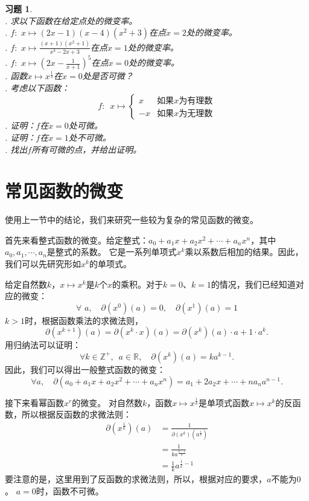 \documentclass[12pt,UTF8]{ctexbook}
\newtheorem{xt}{习题}[section]
\begin{document}
\begin{xt}
    \mbox{} \\
    . 求以下函数在给定点处的微变率。\\
    . $f: \,\, x \mapsto (2x - 1)(x -4)(x^2 + 3)$在点$x = 2$处的微变率。\\
    . $f: \,\, x \mapsto \frac{(x + 1)(x^2 + 1)}{x^3 - 2x + 3}$在点$x = 1$处的微变率。\\
    . $f: \,\, x \mapsto (2x - \frac{1}{x + 1})^5$在点$x = 0$处的微变率。\\
    . 函数$x \mapsto x^{\frac{1}{3}}$在$x = 0$处是否可微？\\
    . 考虑以下函数：
    $$ f: \,\,\, x\mapsto \left\{
        \begin{array}{cl}
            x & \mbox{如果}x\mbox{为有理数} \\
            -x & \mbox{如果}x\mbox{为无理数} 
        \end{array}\right.
    $$
    . 证明：$f$在$x = 0$处可微。\\
    . 证明：$f$在$x = 1$处不可微。\\
    . 找出$f$所有可微的点，并给出证明。
\end{xt}

\section{常见函数的微变}

使用上一节中的结论，我们来研究一些较为复杂的常见函数的微变。

首先来看整式函数的微变。给定整式：$a_0 + a_1 x + a_2 x^2 + \cdots + a_n x^n$，其中$a_0, a_1, \cdots , a_n$是整式的系数。
它是一系列单项式$x^k$乘以系数后相加的结果。因此，我们可以先研究形如$x^k$的单项式。

给定自然数$k$，$x\mapsto x^k$是$k$个$x$的乘积。对于$k=0$、$k=1$的情况，我们已经知道对应的微变：
$$ \forall \,\, a, \quad \partial (x^0) (a) = 0, \quad \partial (x^1) (a) = 1 $$
$k > 1$时，根据函数乘法的求微法则，
$$ \partial (x^{k+1}) (a) = \partial (x^{k} \cdot x) (a) = \partial (x^k) (a) \cdot a + 1 \cdot a^k. $$
用归纳法可以证明：
$$ \forall k \in \mathbb{Z}^+, \,\,\, a\in \mathbb{R}, \quad \partial (x^k) (a) = k a^{k-1}. $$
因此，我们可以得出一般整式函数的微变：
$$ \forall a, \quad \partial (a_0 + a_1 x + a_2 x^2 + \cdots + a_n x^n) = a_1 + 2 a_2 x + \cdots + n a_n a^{n-1}. $$

接下来看幂函数$x^r$的微变。
对自然数$k$，函数$x \mapsto x^{\frac{1}{k}}$是单项式函数$x\mapsto x^k$的反函数，所以根据反函数的求微法则：
\begin{align*}
    \partial (x^{\frac{1}{k}}) (a) &= \frac{1}{\partial (x^k) (a^{\frac{1}{k}})}  \\
    &= \frac{1}{k a^{\frac{k-1}{k}}}  \\
    &= \frac{1}{k} a^{\frac{1}{k} - 1} 
\end{align*}
要注意的是，这里用到了反函数的求微法则，所以，根据对应的要求，$a$不能为$0$。
$a = 0$时，函数不可微。
\end{document}
